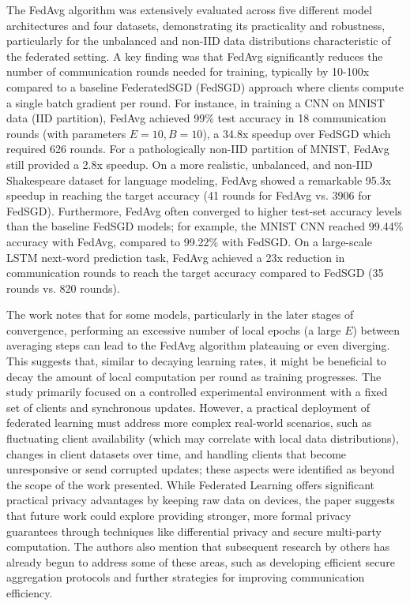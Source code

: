The FedAvg algorithm was extensively evaluated across five different model architectures and four datasets, demonstrating its practicality and robustness, particularly for the unbalanced and non-IID data distributions characteristic of the federated setting. A key finding was that FedAvg significantly reduces the number of communication rounds needed for training, typically by 10-100x compared to a baseline FederatedSGD (FedSGD) approach where clients compute a single batch gradient per round. For instance, in training a CNN on MNIST data (IID partition), FedAvg achieved 99\% test accuracy in 18 communication rounds (with parameters $E=10, B=10$), a 34.8x speedup over FedSGD which required 626 rounds. For a pathologically non-IID partition of MNIST, FedAvg still provided a 2.8x speedup. On a more realistic, unbalanced, and non-IID Shakespeare dataset for language modeling, FedAvg showed a remarkable 95.3x speedup in reaching the target accuracy (41 rounds for FedAvg vs. 3906 for FedSGD). Furthermore, FedAvg often converged to higher test-set accuracy levels than the baseline FedSGD models; for example, the MNIST CNN reached 99.44\% accuracy with FedAvg, compared to 99.22\% with FedSGD. On a large-scale LSTM next-word prediction task, FedAvg achieved a 23x reduction in communication rounds to reach the target accuracy compared to FedSGD (35 rounds vs. 820 rounds).

The work notes that for some models, particularly in the later stages of convergence, performing an excessive number of local epochs (a large \(E\)) between averaging steps can lead to the FedAvg algorithm plateauing or even diverging. This suggests that, similar to decaying learning rates, it might be beneficial to decay the amount of local computation per round as training progresses. The study primarily focused on a controlled experimental environment with a fixed set of clients and synchronous updates. However, a practical deployment of federated learning must address more complex real-world scenarios, such as fluctuating client availability (which may correlate with local data distributions), changes in client datasets over time, and handling clients that become unresponsive or send corrupted updates; these aspects were identified as beyond the scope of the work presented. While Federated Learning offers significant practical privacy advantages by keeping raw data on devices, the paper suggests that future work could explore providing stronger, more formal privacy guarantees through techniques like differential privacy and secure multi-party computation. The authors also mention that subsequent research by others has already begun to address some of these areas, such as developing efficient secure aggregation protocols and further strategies for improving communication efficiency.


